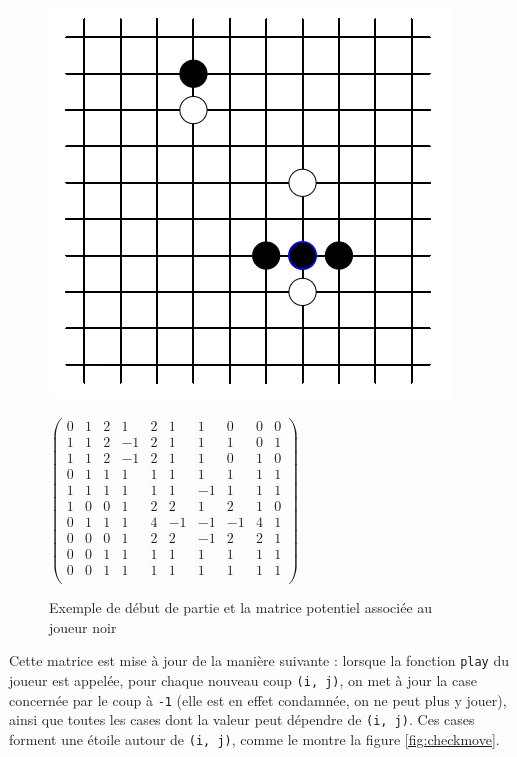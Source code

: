 \documentclass[a4paper,11pt]{article}
\begin{document}
\begin{figure}[!h]
    \caption{\label{fig1} Exemple de début de partie et la matrice potentiel associée au joueur noir}
   \begin{minipage}[c]{.46\linewidth}
      \includegraphics[scale=0.5]{fig2}
   \end{minipage} \hfill
   \begin{minipage}[c]{.46\linewidth}
       $\begin{pmatrix}
           0 & 1 & 2 & 1 & 2 & 1 & 1 & 0 & 0 & 0 \\
           1 & 1 & 2 & -1 & 2 & 1 & 1 & 1 & 0 & 1 \\
           1 & 1 & 2 & -1 & 2 & 1 & 1 & 0 & 1 & 0 \\
           0 & 1 & 1 & 1 & 1 & 1 & 1 & 1 & 1 & 1 \\
           1 & 1 & 1 & 1 & 1 & 1 & -1 & 1 & 1 & 1 \\
           1 & 0 & 0 & 1 & 2 & 2 & 1 & 2 & 1 & 0 \\
           0 & 1 & 1 & 1 & 4 & -1 & -1 & -1 & 4 & 1 \\
           0 & 0 & 0 & 1 & 2 & 2 & -1 & 2 & 2 & 1 \\
           0 & 0 & 1 & 1 & 1 & 1 & 1 & 1 & 1 & 1 \\
           0 & 0 & 1 & 1 & 1 & 1 & 1 & 1 & 1 & 1 \\
       \end{pmatrix}$
   \end{minipage}
\end{figure}

Cette matrice est mise à jour de la manière suivante : lorsque la fonction \verb+play+ du joueur est appelée, pour chaque nouveau coup \verb+(i, j)+, on met à jour la case concernée par le coup à \verb+-1+ (elle est en effet condamnée, on ne peut plus y jouer), ainsi que toutes les cases dont la valeur peut dépendre de \verb+(i, j)+. Ces cases forment une étoile autour de \verb+(i, j)+, comme le montre la figure \ref{fig:checkmove}.
\end{document}
